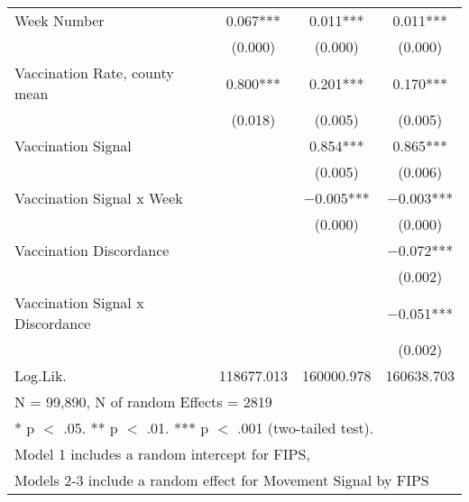\begin{table}[!ht]
\begin{tabular}{lccc}
Week Number & \num{0.067}*** & \num{0.011}*** & \num{0.011}***\\
 & (\num{0.000}) & (\num{0.000}) & (\num{0.000})\\
Vaccination Rate, county mean & \num{0.800}*** & \num{0.201}*** & \num{0.170}***\\
 & (\num{0.018}) & (\num{0.005}) & (\num{0.005})\\
Vaccination Signal &  & \num{0.854}*** & \num{0.865}***\\
 &  & (\num{0.005}) & (\num{0.006})\\
Vaccination Signal x Week &  & \num{-0.005}*** & \num{-0.003}***\\
 &  & (\num{0.000}) & (\num{0.000})\\
Vaccination Discordance &  &  & \num{-0.072}***\\
 &  &  & \vphantom{1} (\num{0.002})\\
Vaccination Signal x Discordance &  &  & \num{-0.051}***\\
 &  &  & (\num{0.002})\\
\midrule
Log.Lik. & \num{118677.013} & \num{160000.978} & \num{160638.703}\\
\bottomrule
\multicolumn{4}{l}{\rule{0pt}{1em}N = 99,890, N of random Effects = 2819}\\
\multicolumn{4}{l}{\rule{0pt}{1em}* p $<$ .05. ** p $<$ .01. *** p $<$ .001 (two-tailed test).}\\
\multicolumn{4}{l}{\rule{0pt}{1em}Model 1 includes a random intercept for FIPS,}\\
\multicolumn{4}{l}{\rule{0pt}{1em}Models 2-3 include a random effect for Movement Signal by FIPS}\\
\end{tabular}
\end{table}
